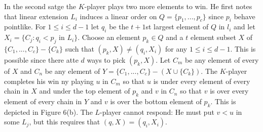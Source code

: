 \documentclass[twoside]{article}
\begin{document}
In the second satge the $K$-player plays two more elements to win. He first notes that linear extension $L_i$
induces a linear order on $Q=\{p_1,...,p_c\}$ since $p_i$ behave pointlike. For $1\leq i \leq d-1$ let
$q_i$ be the $t+1$st largest element of $Q$ in $l_i$ and let $X_i = \{C_j:q_i<p_j$ in $ L_i\}$.
Choose an element $p_k \in Q$ and a $t$ element subset $X$ of $\{C_1,...,C_c\} - \{C_k\}$ such that
$(p_k,X) \neq (q_i, X_i)$ for any $1 \leq i \leq d-1$. This is possible since there atte $d$ ways to pick
$(p_k, X)$. Let $C_m$ be any element of every of $X$ and $C_n$ be any element of
$Y=\{C_1,...,C_c\}-(X\cup \{C_k\})$. The $K$-player completes his win ny playing $u$ in $C_m$ so that
$u$ is under every element of every chain in  $X$ and under the top element of $p_k$ and $v$ in $C_n$
so that $v$ is over every element of every chain in $Y$ and $v$ is over the bottom element of $p_k$.
This is depicted in Figure 6(b). The $L$-player cannot respond: He must put $v<u$ in some $L_j$, but
this requires that $(q,X)=(q_i,X_i)$.\\
\end{document}
